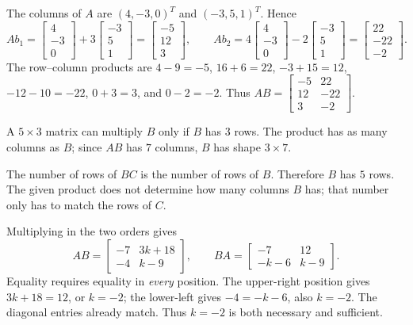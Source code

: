 The columns of $A$ are $(4,-3,0)^T$ and $(-3,5,1)^T$. Hence
\[
 Ab_1=\begin{bmatrix}4\\-3\\0\end{bmatrix}
       +3\begin{bmatrix}-3\\5\\1\end{bmatrix}
       =\begin{bmatrix}-5\\12\\3\end{bmatrix},\qquad
 Ab_2=4\begin{bmatrix}4\\-3\\0\end{bmatrix}
       -2\begin{bmatrix}-3\\5\\1\end{bmatrix}
       =\begin{bmatrix}22\\-22\\-2\end{bmatrix}.
\]
The row--column products are $4-9=-5$, $16+6=22$,
$-3+15=12$, $-12-10=-22$, $0+3=3$, and $0-2=-2$.
Thus $AB=\begin{bmatrix}-5&22\\12&-22\\3&-2\end{bmatrix}$.

A $5\times3$ matrix can multiply $B$ only if $B$ has $3$ rows.
The product has as many columns as $B$; since $AB$ has $7$ columns,
$B$ has shape $\boxed{3\times7}$.

The number of rows of $BC$ is the number of rows of $B$.
Therefore $B$ has $\boxed{5}$ rows. The given product does not determine
how many columns $B$ has; that number only has to match the rows of $C$.

Multiplying in the two orders gives
\[
 AB=\begin{bmatrix}-7&3k+18\\-4&k-9\end{bmatrix},\qquad
 BA=\begin{bmatrix}-7&12\\-k-6&k-9\end{bmatrix}.
\]
Equality requires equality in \emph{every} position. The upper-right
position gives $3k+18=12$, or $k=-2$; the lower-left gives
$-4=-k-6$, also $k=-2$. The diagonal entries already match.
Thus $\boxed{k=-2}$ is both necessary and sufficient.

